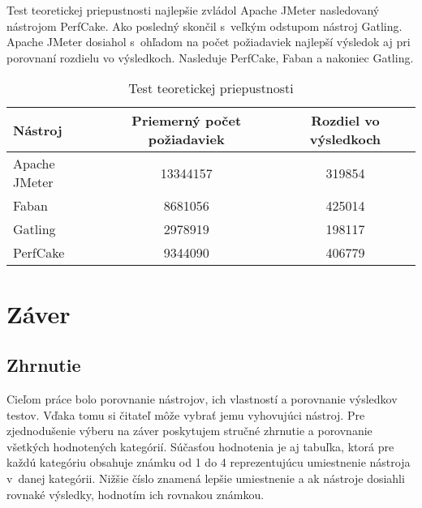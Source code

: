 \documentclass[12pt,oneside,final]{fithesis-utf8}
\begin{document}
\begin{itemize}
Test teoretickej priepustnosti najlepšie zvládol Apache JMeter nasledovaný nástrojom PerfCake. Ako posledný skončil s~veľkým odstupom nástroj Gatling. Apache JMeter dosiahol s~ohľadom na počet požiadaviek najlepší výsledok aj pri porovnaní rozdielu vo výsledkoch. Nasleduje PerfCake, Faban a nakoniec Gatling.

\begin{table}[H]
\begin{center}
\begin{tabular}{ | l | c | c |}
		\hline
		 \textbf{Nástroj} & \textbf{Priemerný počet požiadaviek} & \textbf{Rozdiel vo výsledkoch} \\ \hline
		 Apache JMeter & 13344157 & 319854 \\ \hline
		 Faban & 8681056 & 425014 \\ \hline
		 Gatling & 2978919 & 198117 \\ \hline
		 PerfCake & 9344090 & 406779 \\ \hline
\end{tabular}
\end{center}
\caption{Test teoretickej priepustnosti}
\end{table}

\end{itemize}


\chapter{Záver}

\section{Zhrnutie}
Cieľom práce bolo porovnanie nástrojov, ich vlastností a porovnanie výsledkov testov. Vďaka tomu si čitateľ môže vybrať jemu vyhovujúci nástroj. Pre zjednodušenie výberu na záver poskytujem stručné zhrnutie a porovnanie všetkých hodnotených kategórií. Súčasťou hodnotenia je aj tabuľka, ktorá pre každú kategóriu obsahuje známku od 1 do 4 reprezentujúcu umiestnenie nástroja v~danej kategórii. Nižšie číslo znamená lepšie umiestnenie a ak nástroje dosiahli rovnaké výsledky, hodnotím ich rovnakou známkou.
\end{document}
